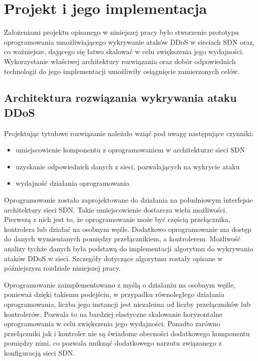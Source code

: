 \chapter{Projekt i jego implementacja}

Założeniami projektu opisanego w niniejszej pracy było stworzenie prototypu
oprogramowania umożliwiającego wykrywanie ataków DDoS w sieciach SDN oraz, co
ważniejsze, dającego się łatwo skalować w celu zwiększenia jego wydajności.
Wykorzystanie właściwej architektury rozwiązania oraz dobór odpowiednich
technologii do jego implementacji umożliwiły osiągnięcie zamierzonych celów.

\section{Architektura rozwiązania wykrywania ataku DDoS}

Projektując tytułowe rozwiązanie należało wziąć pod uwagę następujące czynniki:
\begin{itemize}
  \item umiejscowienie komponentu z oprogramowaniem w architekturze sieci SDN
  \item uzyskanie odpowiednich danych z sieci, pozwalających na wykrycie ataku
  \item wydajność działania oprogramowania
\end{itemize}

Oprogramowanie zostało zaprojektowane do działania na południowym interfejsie
architektury sieci SDN. Takie umiejscowienie dostarcza wielu możliwości.
Pierwszą z nich jest to, że oprogramowanie może być częścią przełącznika,
kontrolera lub działać na osobnym węźle. Dodatkowo oprogramowanie ma dostęp do
danych wymienianych pomiędzy przełącznikiem, a kontrolerem. Możliwość analizy
tychże danych była podstawą do implementacji algorytmu do wykrywania ataków DDoS
w sieci. Szczegóły dotyczące algorytmu zostały opisane w późniejszym rozdziale
niniejszej pracy. 

Oprogramowanie zaimplementowano z myślą o działaniu na osobnym węźle,
ponieważ dzięki takiemu podejściu, w przypadku równoległego działania
oprogramowania, liczba jego instancji jest niezależna od liczby przełączników
lub kontrolerów. Pozwala to na bardziej elastyczne skalowanie horyzontalne
oprogramowania w celu zwiększenia jego wydajności. Ponadto zarówno przełączniki
jak i kontroler nie są świadome obecności dodatkowego komponentu pomiędzy nimi,
co pozwala uniknąć dodatkowego narzutu związanego z konfiguracją sieci SDN.

